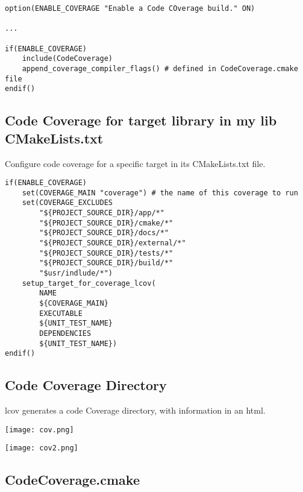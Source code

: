 \begin{verbatim}
option(ENABLE_COVERAGE "Enable a Code COverage build." ON)

...

if(ENABLE_COVERAGE)
    include(CodeCoverage)
    append_coverage_compiler_flags() # defined in CodeCoverage.cmake file
endif()

\end{verbatim}

\subsection{Code Coverage for target library in my lib CMakeLists.txt}

Configure code coverage for a specific target in its CMakeLists.txt file.

\begin{verbatim}
if(ENABLE_COVERAGE)
    set(COVERAGE_MAIN "coverage") # the name of this coverage to run
    set(COVERAGE_EXCLUDES
        "${PROJECT_SOURCE_DIR}/app/*"
        "${PROJECT_SOURCE_DIR}/cmake/*"
        "${PROJECT_SOURCE_DIR}/docs/*"
        "${PROJECT_SOURCE_DIR}/external/*"
        "${PROJECT_SOURCE_DIR}/tests/*"
        "${PROJECT_SOURCE_DIR}/build/*"
        "$usr/indlude/*")
    setup_target_for_coverage_lcov(
        NAME
        ${COVERAGE_MAIN}
        EXECUTABLE
        ${UNIT_TEST_NAME}
        DEPENDENCIES
        ${UNIT_TEST_NAME})
endif()
\end{verbatim}


\subsection{Code Coverage Directory}

lcov generates a code Coverage directory, with information in an html.


\begin{center}
    \texttt{[image: cov.png]}
\end{center}


\begin{center}
    \texttt{[image: cov2.png]}
\end{center}



\subsection{CodeCoverage.cmake}

